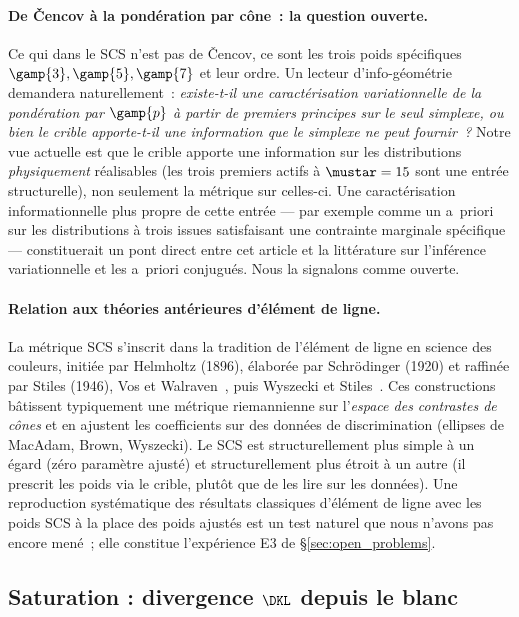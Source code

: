 \documentclass[12pt,a4paper]{article}
\begin{document}
\paragraph{De \v{C}encov \`a la pond\'eration par c\^one~: la question ouverte.}
Ce qui dans le SCS n'est pas de \v{C}encov, ce sont les trois poids
sp\'ecifiques $\gamp{3}, \gamp{5}, \gamp{7}$ et leur ordre. Un
lecteur d'info-g\'eom\'etrie demandera naturellement~: \emph{existe-t-il
une caract\'erisation variationnelle de la pond\'eration par
$\gamp{p}$ \`a partir de premiers principes sur le seul simplexe, ou
bien le crible apporte-t-il une information que le simplexe ne peut
fournir~?} Notre vue actuelle est que le crible apporte une
information sur les distributions \emph{physiquement} r\'ealisables
(les trois premiers actifs \`a $\mustar = 15$ sont une entr\'ee
structurelle), non seulement la m\'etrique sur celles-ci. Une
caract\'erisation informationnelle plus propre de cette entr\'ee
--- par exemple comme un a~priori sur les distributions \`a trois
issues satisfaisant une contrainte marginale sp\'ecifique ---
constituerait un pont direct entre cet article et la litt\'erature
sur l'inf\'erence variationnelle et les a~priori conjugu\'es. Nous la
signalons comme ouverte.

\paragraph{Relation aux th\'eories ant\'erieures d'\'el\'ement de ligne.}
La m\'etrique SCS s'inscrit dans la tradition de l'\'el\'ement de
ligne en science des couleurs, initi\'ee par Helmholtz (1896),
\'elabor\'ee par Schr\"odinger (1920) et raffin\'ee par Stiles (1946),
Vos et Walraven~\cite{voswalraven1972}, puis Wyszecki et
Stiles~\cite{wyszecki2000}. Ces constructions b\^atissent
typiquement une m\'etrique riemannienne sur l'\emph{espace des
contrastes de c\^ones} et en ajustent les coefficients sur des
donn\'ees de discrimination (ellipses de MacAdam, Brown, Wyszecki).
Le SCS est structurellement plus simple \`a un \'egard (z\'ero
param\`etre ajust\'e) et structurellement plus \'etroit \`a un
autre (il prescrit les poids via le crible, plut\^ot que de les lire
sur les donn\'ees). Une reproduction syst\'ematique des r\'esultats
classiques d'\'el\'ement de ligne avec les poids SCS \`a la place
des poids ajust\'es est un test naturel que nous n'avons pas encore
men\'e~; elle constitue l'exp\'erience E3 de
\S\ref{sec:open_problems}.

\subsection{Saturation : divergence $\DKL$ depuis le blanc}
\end{document}

